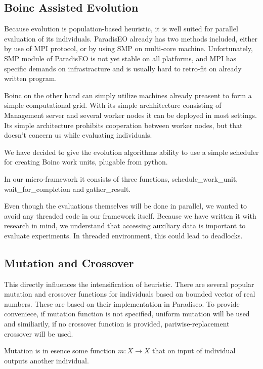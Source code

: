 \documentclass[12pt,oneside]{fithesis2}
\begin{document}
\subsection{Boinc Assisted Evolution}

Because evolution is population-based heuristic, it is well suited for parallel evaluation of its individuals. ParadisEO already has two methods included, either by use of MPI protocol, or by using SMP on multi-core machine\cite{liefooghe2007paradiseo}. Unfortunately, SMP module of ParadisEO is not yet stable on all platforms, and MPI has specific demands on infrastracture and is usually hard to retro-fit on already written program. 

Boinc on the other hand  can simply utilize machines already preasent to form a simple computational grid. With its simple archhitecture consisting of Management server and several worker nodes it can be deployed in most settings. Its simple architecture prohibits cooperation between worker nodes, but that doesn't concern us while evaluating individuals.

We have decided to give the evolution algorithms ability to use a simple scheduler for creating Boinc work units, plugable from python.

In our micro-framework it consists of three functions, schedule\_work\_unit, wait\_for\_completion and gather\_result.

Even though the evaluations themselves will be done in parallel, we wanted to avoid any threaded code in our framework itself. Because we have written it with research in mind, we understand that accessing auxiliary data is important to evaluate experiments. In threaded environment, this could lead to deadlocks.

\subsection{Mutation and Crossover}
This directly influences the intensification of heuristic. There are several popular mutation and crossover functions for individuals based on bounded vector of real numbers. These are based on their implementation in Paradiseo. To provide conveniece, if mutation function is not specified, uniform mutation will be used and similiarily, if no crossover function is provided, pariwise-replacement crossover will be used. 

Mutation is in esence some function $m:X \to X$ that on input of individual outputs another individual.
\end{document}
